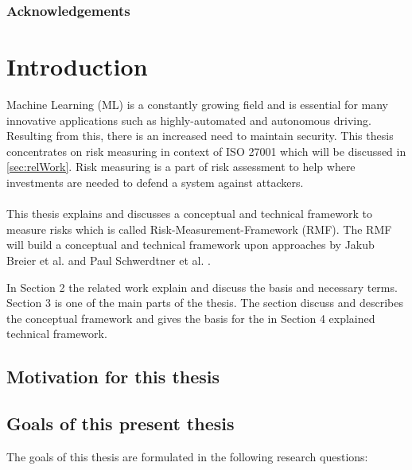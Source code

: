 \begin{abstract}

\end{abstract}

\subsubsection*{Acknowledgements}

\newpage

\section{Introduction}
\label{sec:intro}

Machine Learning (ML) is a constantly growing field and is essential for many innovative applications such as highly-automated and autonomous driving. Resulting from this,
there is an increased need to maintain security. This thesis concentrates on risk measuring in context of ISO 27001 which will be discussed in \ref{sec:relWork}. Risk
measuring is a part of risk assessment to help where investments are needed to defend a system against attackers. \\ \\
This thesis explains and discusses a conceptual and technical framework to measure risks which is called Risk-Measurement-Framework (RMF). The RMF will build a conceptual and technical
framework upon approaches by Jakub Breier et al. \cite{DBLP:journals/corr/abs-2012-04884} and Paul Schwerdtner et al. \cite{DBLP:journals/corr/abs-2011-04328}.

In Section 2 the related work explain and discuss the basis and necessary terms. Section 3 is one of the main parts of the thesis. The section discuss and describes the conceptual framework and gives the basis for the in Section 4 explained technical framework.

\subsection{Motivation for this thesis}

\subsection{Goals of this present thesis}

The goals of this thesis are formulated in the following research questions:


